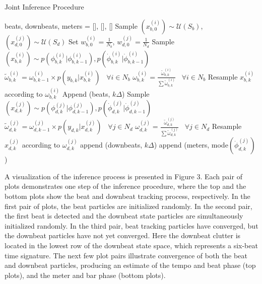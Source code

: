 \documentclass{article}
\begin{document}
\begin{algorithm}
    \caption{Joint Inference Procedure}
    \begin{algorithmic}
\STATE beats, downbeats, meters = [], [], []
    \vspace{1mm}
\STATE Sample $(x_{b,0}^{(i)}) \sim \mathcal U({S_b} )$, $(x_{d,0}^{(j)}) \sim \mathcal U({S_d})$
\STATE Set $w_{b,0}^{(i)} = \frac{1}{N_b}$, $w_{d,0}^{(j)} = \frac{1}{N_d}$
    \vspace{1mm}
\STATE Sample $(x_{b,k}^{(i)}) \sim p(\phi_{b,k}^{(i)}|\phi_{b,k-1}^{(i)}),p(\dot{\phi}_{b,k}^{(i)}|\dot{\phi}_{b,k-1}^{(i)})$
        \STATE $\tilde\omega_{b,k}^{(i)} = \omega_{b,k-1}^{(i)} \times p(y_{b,k}|x_{b,k}^{(i)}) \;\;\; \forall i \in N_b$
        \STATE $\omega_{b,k}^{(i)}=\frac{\tilde\omega_{b,k}^{(i)}}{\sum\tilde\omega_{b,k}^{(i)}}  \;\;\; \forall i \in N_b $
            \STATE Resample $x_{b,k}^{(i)}$ according to $ \omega_{b,k}^{(i)}$
\ENDIF
                \STATE Append (beats, $k\Delta$)
                \STATE Sample $(x_{d,k}^{(j)}) \sim p(\phi_{d,k}^{(j)}|\phi_{d,k-1}^{(j)}), p(\dot{\phi}_{d,k}^{(j)}|\dot{\phi}_{d,k-1}^{(j)})$
                \STATE $\tilde\omega_{d,k}^{(j)} = \omega_{d,k-1}^{(j)} \times p(y_{d,k}|x_{d,k}^{(j)}) \;\;\; \forall j \in N_d$
                \STATE $\omega_{d,k}^{(j)}=\frac{\tilde\omega_{d,k}^{(j)}}{\sum\tilde\omega_{d,k}^{(j)}}  \;\;\; \forall j \in N_d $
                \STATE Resample $x_{d,k}^{(j)}$ according to $\omega_{d,k}^{(j)}$
                \STATE append (downbeats, $k\Delta$)
                \STATE append (meters, mode$(\dot\phi_{d,k}^{(j)})$)
                \ENDIF
        \ENDIF
\ENDFOR
\end{algorithmic}
\end{algorithm}


A visualization of the inference process is presented in Figure 3. Each pair of plots demonstrates one step of the inference procedure, where the top and the bottom plots show the beat and downbeat tracking process, respectively. In the first pair of plots, the beat particles are initialized randomly. In the second pair, the first beat is detected and the downbeat state particles are simultaneously initialized randomly. In the third pair, beat tracking particles have converged, but the downbeat particles have not yet converged. Here the downbeat clutter is located in the lowest row of the downbeat state space, which represents a six-beat time signature. The next few plot pairs illustrate convergence of both the beat and downbeat particles, producing an estimate of the tempo and beat phase (top plots), and the meter and bar phase (bottom plots).
\end{document}
